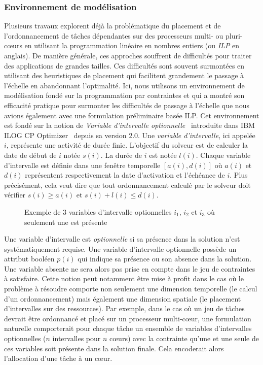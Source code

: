 \documentclass[main.tex]{subfiles}
\begin{document}
\subsubsection{Environnement de modélisation}
Plusieurs travaux explorent déjà la problématique du placement et de l'ordonnancement de tâches dépendantes sur des processeurs multi- ou pluri-c\oe{}urs en utilisant la programmation linéaire en nombres entiers (ou \emph{ILP} en anglais). De manière générale, ces approches souffrent de difficultés pour traiter des applications de grandes tailles. Ces difficultés sont souvent surmontées en utilisant des heuristiques de placement qui facilitent grandement le passage à l'échelle en abandonnant l'optimalité. Ici, nous utilisons un environnement de modélisation fondé sur la programmation par contraintes et qui a montré son efficacité pratique pour surmonter les difficultés de passage à l'échelle que nous avions également avec une formulation préliminaire basée ILP. Cet environnement est fondé sur la notion de \emph{Variable d'intervalle optionnelle}~\cite{Laborie08, Laborie09} introduite dans IBM ILOG CP Optimizer~\cite{OPL} depuis sa version 2.0. Une \emph{variable d'intervalle}, ici appelée $i$, représente une activité de durée finie. L'objectif du solveur est de calculer la date de début de $i$ notée $s(i)$. La durée de $i$ est notée $l(i)$. Chaque variable d'intervalle est définie dans une fenêtre temporelle $[ a(i) , d(i) ]$ où $a(i)$ et $d(i)$ représentent respectivement la date d'activation et l'échéance de $i$. Plus précisément, cela veut dire que tout ordonnancement calculé par le solveur doit vérifier $s(i) \geq a(i)$ et $s(i)+l(i) \leq d(i)$. 

\begin{figure}
    \centering
    \scalebox{0.8}{}
    \caption{Exemple de 3 variables d'intervalle optionnelles $i_1$, $i_2$ et $i_3$ où seulement une est présente}
    \label{fig_resumeFr_condTimeInterval}
\end{figure}

Une variable d'intervalle est \emph{optionnelle} si sa présence dans la solution n'est systématiquement requise. Une variable d'intervalle optionnelle possède un attribut booléen $p(i)$ qui indique sa présence ou son absence dans la solution. Une variable absente ne sera alors pas prise en compte dans le jeu de contraintes à satisfaire. Cette notion peut notamment être mise à profit dans le cas où le problème à résoudre comporte non seulement une dimension temporelle (le calcul d'un ordonnancement) mais également une dimension spatiale (le placement d'intervalles sur des ressources). Par exemple, dans le cas où un jeu de tâches devrait être ordonnancé et placé sur un processeur multi-c\oe{}ur, une formulation naturelle comporterait pour chaque tâche un ensemble de variables d'intervalles optionnelles ($n$ intervalles pour $n$ c\oe{}urs) avec la contrainte qu'une et une seule de ces variables soit présente dans la solution finale. Cela encoderait alors l'allocation d'une tâche à un c\oe{}ur.
\end{document}
